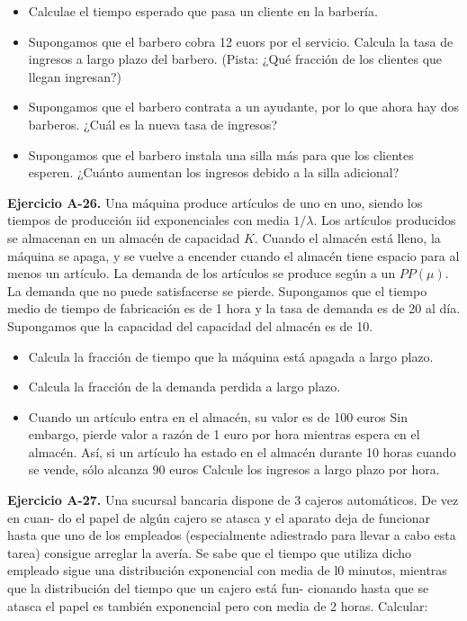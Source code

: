 \documentclass[
]{book}
\providecommand{\tightlist}{%
  \setlength{\itemsep}{0pt}\setlength{\parskip}{0pt}}
\theoremstyle{definition}
\theoremstyle{definition}
\theoremstyle{definition}
\theoremstyle{definition}
\theoremstyle{remark}
\begin{document}
\begin{itemize}
\tightlist
\item
  Calculae el tiempo esperado que pasa un cliente en la barbería.
\item
  Supongamos que el barbero cobra 12 euors por el servicio. Calcula la tasa de ingresos a largo plazo del barbero. (Pista: ¿Qué fracción de los clientes que llegan ingresan?)
\item
  Supongamos que el barbero contrata a un ayudante, por lo que ahora hay dos barberos. ¿Cuál es la nueva tasa de ingresos?
\item
  Supongamos que el barbero instala una silla más para que los clientes esperen. ¿Cuánto aumentan los ingresos debido a la silla adicional?
\end{itemize}

\textbf{Ejercicio A-26.} Una máquina produce artículos de uno en uno, siendo los tiempos de producción iid exponenciales con media \(1/\lambda\). Los artículos producidos se almacenan en un almacén de capacidad \(K\). Cuando el almacén está lleno, la máquina se apaga, y se vuelve a encender cuando el almacén tiene espacio para al menos un artículo. La demanda de los artículos se produce según a un \(PP(\mu)\). La demanda que no puede satisfacerse se pierde. Supongamos que el tiempo medio de tiempo de fabricación es de 1 hora y la tasa de demanda es de 20 al día. Supongamos que la capacidad del capacidad del almacén es de 10.

\begin{itemize}
\tightlist
\item
  Calcula la fracción de tiempo que la máquina está apagada a largo plazo.
\item
  Calcula la fracción de la demanda perdida a largo plazo.
\item
  Cuando un artículo entra en el almacén, su valor es de 100 euros Sin embargo, pierde valor a razón de
  1 euro por hora mientras espera en el almacén. Así, si un artículo ha estado en el almacén durante 10 horas cuando se vende, sólo alcanza 90 euros Calcule los ingresos a largo plazo por hora.
\end{itemize}

\textbf{Ejercicio A-27.} Una sucursal bancaria dispone de 3 cajeros automáticos. De vez en cuan- do el papel de algún cajero se atasca y el aparato deja de funcionar hasta que uno de los empleados (especialmente adiestrado para llevar a cabo esta tarea) consigue arreglar la avería. Se sabe que el tiempo que utiliza dicho empleado sigue una distribución exponencial con media de l0 minutos, mientras que la distribución del tiempo que un cajero está fun- cionando hasta que se atasca el papel es también exponencial pero con media de 2 horas. Calcular:
\end{document}
